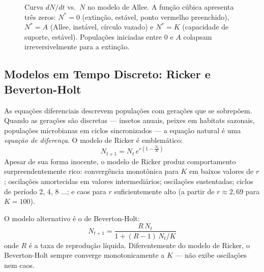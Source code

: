 \begin{figure}[htbp]
\centering
{}
\caption{Curva $dN/dt$ vs.\ $N$ no modelo de Allee. A função cúbica apresenta três zeros: $N^*=0$ (extinção, estável, ponto vermelho preenchido), $N^*=A$ (Allee, instável, círculo vazado) e $N^*=K$ (capacidade de suporte, estável). Populações iniciadas entre $0$ e $A$ colapsam irreversivelmente para a extinção.}
\label{fig:10-allee}
\end{figure}

\subsection{Modelos em Tempo Discreto: Ricker e Beverton-Holt}
\label{sub:image10-discreto}

As equações diferenciais descrevem populações com gerações que se sobrepõem.
Quando as gerações são discretas --- insetos anuais, peixes em habitats
sazonais, populações microbianas em ciclos sincronizados --- a equação natural é
uma \emph{equação de diferença}. O modelo de Ricker é emblemático:
\begin{equation}
N_{t+1} = N_t\, e^{r\left(1 - \frac{N_t}{K}\right)}
\end{equation}
Apesar de sua forma inocente, o modelo de Ricker produz comportamento
surpreendentemente rico: convergência monotônica para $K$ em baixos valores de
$r$; oscilações amortecidas em valores intermediários; oscilações sustentadas;
ciclos de período 2, 4, 8 ...; e caos para $r$ suficientemente alto (a partir
de $r \approx 2{,}69$ para $K = 100$).

O modelo alternativo é o de Beverton-Holt:
\begin{equation}
N_{t+1} = \frac{R\, N_t}{1 + (R - 1)\, N_t / K}
\end{equation}
onde $R$ é a taxa de reprodução líquida. Diferentemente do modelo de Ricker,
o Beverton-Holt sempre converge monotonicamente a $K$ --- não exibe oscilações
nem caos.

